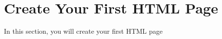 \chapter{Create Your First HTML Page}\label{ch:create-your-first-html-page}

In this section, you will create your first HTML page
